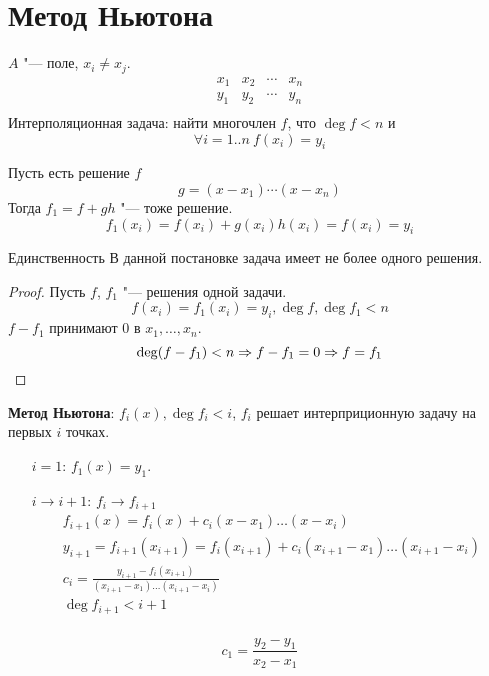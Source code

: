 ﻿\section{Метод Ньютона}
\begin{Def}
$A$ "--- поле, $x_i \ne x_j$.
\[
\begin{array}{c|c|c|c}
x_1 & x_2 & \cdots & x_n\\
\hline
y_1 & y_2 & \cdots & y_n\\
\end{array}
\]
Интерполяционная задача: найти многочлен $f$, что $\deg f < n$ и
\[ \forall i=1..n\: f(x_i) = y_i \]
\end{Def}

Пусть есть решение $f$
\[ g = (x - x_1) \cdots (x - x_n) \]
Тогда $f_1 = f + gh$ "--- тоже решение.
\[ f_1(x_i) = f(x_i) + g(x_i)h(x_i) = f(x_i) = y_i \]

\begin{theorem}{Единственность}
В данной постановке задача имеет не более одного решения. 
\end{theorem}
\begin{proof}
Пусть $f$, $f_1$ "--- решения одной задачи.
\[ f(x_i) = f_1(x_i) = y_i, \deg f, \deg f_1 < n \]
$f - f_1$ принимают 0 в $x_1, \ldots, x_n$.
\[ \deg(f - f_1) < n \Rightarrow f - f_1 = 0 \Rightarrow f = f_1 \]
\end{proof}

\textbf{Метод Ньютона}: $f_i(x), \deg f_i < i$, $f_i$ решает интерприционную задачу на первых $i$ точках.

\begin{itemize}
\item[$i = 1$:] $f_1(x) = y_1$.
\item[$i \to i + 1$:] $f_i \to f_{i + 1}$
\begin{gather*}
f_{i + 1}(x) = f_i(x) + c_i(x - x_1)\ldots(x - x_i) \\
y_{i + 1} = f_{i + 1}(x_{i + 1}) = f_i(x_{i + 1}) + c_i(x_{i + 1} - x_1) \ldots (x_{i + 1} - x_i) \\
c_i = \frac{y_{i + 1} - f_i(x_{i + 1})}{(x_{i + 1} - x_{1}) \ldots (x_{i + 1} - x_{i})} \\
\deg f_{i + 1} < i + 1 \\
\end{gather*}
\end{itemize}

\begin{Rem}
\[ c_1 = \frac{y_2 - y_1}{x_2 - x_1} \]
\end{Rem}